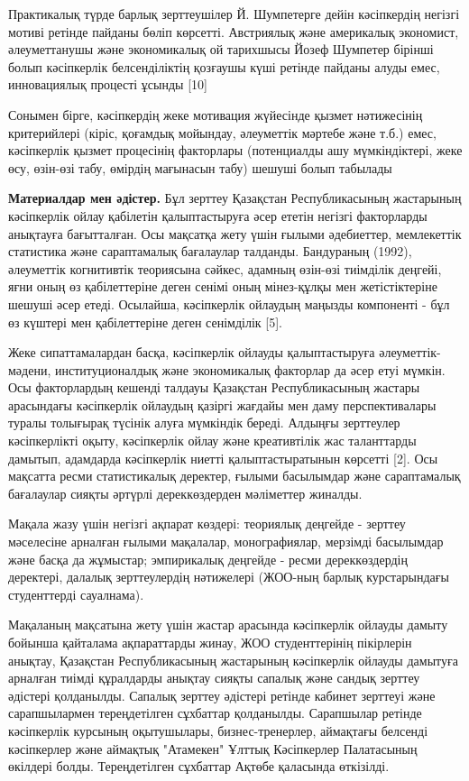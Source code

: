 Практикалық түрде барлық зерттеушілер Й. Шумпетерге дейін кәсіпкердің
негізгі мотиві ретінде пайданы бөліп көрсетті. Австриялық және
америкалық экономист, әлеуметтанушы және экономикалық ой тарихшысы Йозеф
Шумпетер бірінші болып кәсіпкерлік белсенділіктің қозғаушы күші ретінде
пайданы алуды емес, инновациялық процесті ұсынды {[}10{]}

Сонымен бірге, кәсіпкердің жеке мотивация жүйесінде қызмет нәтижесінің
критерийлері (кіріс, қоғамдық мойындау, әлеуметтік мәртебе және т.б.)
емес, кәсіпкерлік қызмет процесінің факторлары (потенциалды ашу
мүмкіндіктері, жеке өсу, өзін-өзі табу, өмірдің мағынасын табу) шешуші
болып табылады

{\bfseries Материалдар мен әдістер.} Бұл зерттеу Қазақстан Республикасының
жастарының кәсіпкерлік ойлау қабілетін қалыптастыруға әсер ететін
негізгі факторларды анықтауға бағытталған. Осы мақсатқа жету үшін ғылыми
әдебиеттер, мемлекеттік статистика және сараптамалық бағалаулар
талданды. Бандураның (1992), әлеуметтік когнитивтік теориясына сәйкес,
адамның өзін-өзі тиімділік деңгейі, яғни оның өз қабілеттеріне деген
сенімі оның мінез-құлқы мен жетістіктеріне шешуші әсер етеді. Осылайша,
кәсіпкерлік ойлаудың маңызды компоненті - бұл өз күштері мен
қабілеттеріне деген сенімділік {[}5{]}.

Жеке сипаттамалардан басқа, кәсіпкерлік ойлауды қалыптастыруға
әлеуметтік-мәдени, институционалдық және экономикалық факторлар да әсер
етуі мүмкін. Осы факторлардың кешенді талдауы Қазақстан Республикасының
жастары арасындағы кәсіпкерлік ойлаудың қазіргі жағдайы мен даму
перспективалары туралы толығырақ түсінік алуға мүмкіндік береді. Алдыңғы
зерттеулер кәсіпкерлікті оқыту, кәсіпкерлік ойлау және креативтілік жас
таланттарды дамытып, адамдарда кәсіпкерлік ниетті қалыптастыратынын
көрсетті {[}2{]}. Осы мақсатта ресми статистикалық деректер, ғылыми
басылымдар және сараптамалық бағалаулар сияқты әртүрлі дереккөздерден
мәліметтер жиналды.

Мақала жазу үшін негізгі ақпарат көздері: теориялық деңгейде - зерттеу
мәселесіне арналған ғылыми мақалалар, монографиялар, мерзімді басылымдар
және басқа да жұмыстар; эмпирикалық деңгейде - ресми дереккөздердің
деректері, далалық зерттеулердің нәтижелері (ЖОО-ның барлық
курстарындағы студенттерді сауалнама).

Мақаланың мақсатына жету үшін жастар арасында кәсіпкерлік ойлауды дамыту
бойынша қайталама ақпараттарды жинау, ЖОО студенттерінің пікірлерін
анықтау, Қазақстан Республикасының жастарының кәсіпкерлік ойлауды
дамытуға арналған тиімді құралдарды анықтау сияқты сапалық және сандық
зерттеу әдістері қолданылды. Сапалық зерттеу әдістері ретінде кабинет
зерттеуі және сарапшылармен тереңдетілген сұхбаттар қолданылды.
Сарапшылар ретінде кәсіпкерлік курсының оқытушылары, бизнес-тренерлер,
аймақтағы белсенді кәсіпкерлер және аймақтық "Атамекен" Ұлттық
Кәсіпкерлер Палатасының өкілдері болды. Тереңдетілген сұхбаттар Ақтөбе
қаласында өткізілді.

